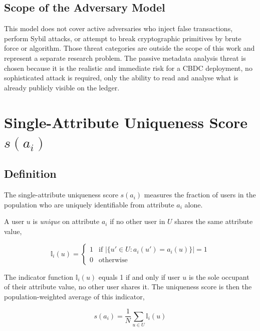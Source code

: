 \subsection{Scope of the Adversary Model}

This model does not cover active adversaries who inject
false transactions, perform Sybil attacks, or attempt to
break cryptographic primitives by brute force or algorithm.
Those threat categories are outside the scope of this
work and represent a separate research problem. The
passive metadata analysis threat is chosen because it is
the realistic and immediate risk for a CBDC deployment,
no sophisticated attack is required, only the ability to
read and analyse what is already publicly visible on the
ledger.

\section{Single-Attribute Uniqueness Score \texorpdfstring{$s(a_i)$}{s(ai)}}
\label{sec:s_attr}

\subsection{Definition}

The single-attribute uniqueness score $s(a_i)$ measures the
fraction of users in the population who are uniquely
identifiable from attribute $a_i$ alone.

A user $u$ is \textit{unique} on attribute $a_i$ if no
other user in $U$ shares the same attribute value,

\begin{equation}
\mathbb{I}_i(u) =
\begin{cases}
1 & \text{if } |\{u' \in U : a_i(u') = a_i(u)\}| = 1 \\
0 & \text{otherwise}
\end{cases}
\label{eq:indicator}
\end{equation}

The indicator function $\mathbb{I}_i(u)$ equals 1 if and
only if user $u$ is the sole occupant of their attribute
value, no other user shares it. The uniqueness score is
then the population-weighted average of this indicator,

\begin{equation}
s(a_i) = \frac{1}{N} \sum_{u \in U} \mathbb{I}_i(u)
\label{eq:s_single}
\end{equation}

